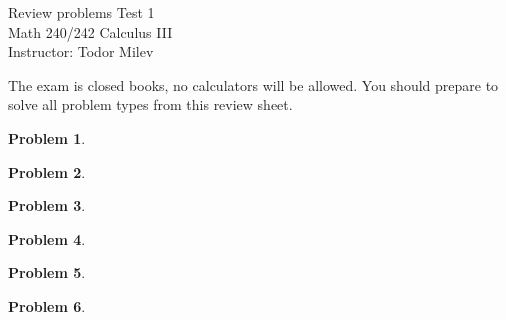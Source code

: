 \documentclass{article}
\newtheorem{problem}{Problem}
\begin{document}
\begin{center}
\Large
Review problems Test 1\\ Math 240/242 Calculus III \\ \normalsize Instructor: Todor Milev
\end{center}


\noindent The exam is closed books, no calculators will be allowed. You should prepare to solve all problem types from this review sheet.

\begin{problem}

\end{problem}
\begin{problem}

\end{problem}

\begin{problem}

\end{problem}

\begin{problem}

\end{problem}

\begin{problem}

\end{problem}

\begin{problem}

\end{problem}
\end{document}
